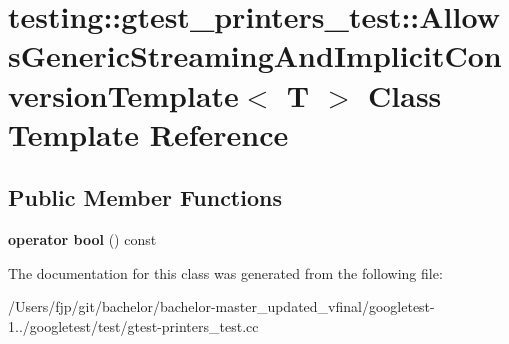 \hypertarget{classtesting_1_1gtest__printers__test_1_1_allows_generic_streaming_and_implicit_conversion_template}{}\section{testing\+:\+:gtest\+\_\+printers\+\_\+test\+:\+:Allows\+Generic\+Streaming\+And\+Implicit\+Conversion\+Template$<$ T $>$ Class Template Reference}
\label{classtesting_1_1gtest__printers__test_1_1_allows_generic_streaming_and_implicit_conversion_template}
\subsection*{Public Member Functions}
\begin{DoxyCompactItemize}
\item 
\mbox{\label{classtesting_1_1gtest__printers__test_1_1_allows_generic_streaming_and_implicit_conversion_template_af5f8ea44d7d86283b4c004a994ddd7f9}} 
{\bfseries operator bool} () const
\end{DoxyCompactItemize}


The documentation for this class was generated from the following file\+:\begin{DoxyCompactItemize}
\item 
/\+Users/fjp/git/bachelor/bachelor-\/master\+\_\+updated\+\_\+vfinal/googletest-\/1../googletest/test/gtest-\/printers\+\_\+test.\+cc\end{DoxyCompactItemize}
